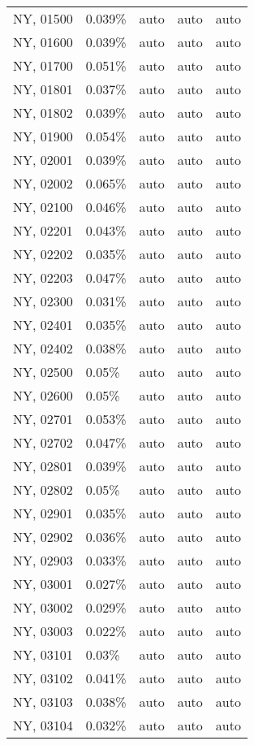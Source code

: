 \begin{longtable}[]{@{}lllll@{}}
NY, 01500 & 0.039\% & auto & auto & auto \\
NY, 01600 & 0.039\% & auto & auto & auto \\
NY, 01700 & 0.051\% & auto & auto & auto \\
NY, 01801 & 0.037\% & auto & auto & auto \\
NY, 01802 & 0.039\% & auto & auto & auto \\
NY, 01900 & 0.054\% & auto & auto & auto \\
NY, 02001 & 0.039\% & auto & auto & auto \\
NY, 02002 & 0.065\% & auto & auto & auto \\
NY, 02100 & 0.046\% & auto & auto & auto \\
NY, 02201 & 0.043\% & auto & auto & auto \\
NY, 02202 & 0.035\% & auto & auto & auto \\
NY, 02203 & 0.047\% & auto & auto & auto \\
NY, 02300 & 0.031\% & auto & auto & auto \\
NY, 02401 & 0.035\% & auto & auto & auto \\
NY, 02402 & 0.038\% & auto & auto & auto \\
NY, 02500 & 0.05\% & auto & auto & auto \\
NY, 02600 & 0.05\% & auto & auto & auto \\
NY, 02701 & 0.053\% & auto & auto & auto \\
NY, 02702 & 0.047\% & auto & auto & auto \\
NY, 02801 & 0.039\% & auto & auto & auto \\
NY, 02802 & 0.05\% & auto & auto & auto \\
NY, 02901 & 0.035\% & auto & auto & auto \\
NY, 02902 & 0.036\% & auto & auto & auto \\
NY, 02903 & 0.033\% & auto & auto & auto \\
NY, 03001 & 0.027\% & auto & auto & auto \\
NY, 03002 & 0.029\% & auto & auto & auto \\
NY, 03003 & 0.022\% & auto & auto & auto \\
NY, 03101 & 0.03\% & auto & auto & auto \\
NY, 03102 & 0.041\% & auto & auto & auto \\
NY, 03103 & 0.038\% & auto & auto & auto \\
NY, 03104 & 0.032\% & auto & auto & auto \\

\end{longtable}
